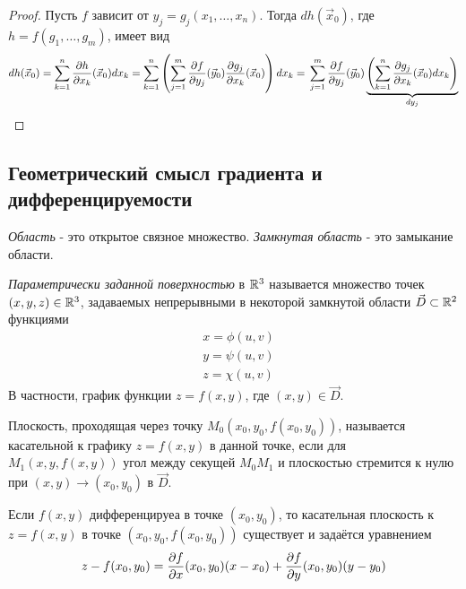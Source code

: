 \begin{proof}
	Пусть $f$ зависит от $y_j = g_j(x_1, \ldots, x_n)$. Тогда $dh(\vec{x}_0)$, где $h = f(g_1, \ldots, g_m)$, имеет вид
	\[
		dh(\vec{x}_0) = \sum\limits_{k = 1}^n \frac{\partial h}{\partial x_k} (\vec{x}_0) dx_k = \sum\limits_{k = 1}^n \left(\sum\limits_{j = 1}^m \frac{\partial f}{\partial y_j} (\vec{y}_0) \frac{\partial g_j}{\partial x_k} (\vec{x}_0)\right) dx_k =
		\\
		\sum\limits_{j = 1}^m \frac{\partial f}{\partial y_j} (\vec{y}_0) \underbrace{\left(\sum\limits_{k = 1}^n \frac{\partial g_j}{\partial x_k} (\vec{x}_0) dx_k\right)}_{dy_j}
	\]
\end{proof}

\subsection{Геометрический смысл градиента и дифференцируемости}

\begin{definition}
	\textit{Область} - это открытое связное множество. \textit{Замкнутая область} - это замыкание области.
\end{definition}

\begin{definition}
	\textit{Параметрически заданной поверхностью} в $\mathbb{R}^3$ называется множество точек $(x, y, z) \in \mathbb{R}^3$, задаваемых непрерывными в некоторой замкнутой области $\vec{D} \subset \mathbb{R}^2$ функциями
	\begin{align*}
		&{x = \phi(u, v)}
		\\
		&{y = \psi(u, v)}
		\\
		&{z = \chi(u, v)}
	\end{align*}
	В частности, график функции $z = f(x, y)$, где $(x, y) \in \vec{D}$.
\end{definition}

\begin{definition}
	Плоскость, проходящая через точку $M_0(x_0, y_0, f(x_0, y_0))$, называется касательной к графику $z = f(x, y)$ в данной точке, если для $M_1(x, y, f(x, y))$ угол между секущей $M_0 M_1$ и плоскостью стремится к нулю при $(x, y) \to (x_0, y_0)$ в $\vec{D}$.
\end{definition}


\begin{theorem}
	Если $f(x, y)$ дифференцируеа в точке $(x_0, y_0)$, то касательная плоскость к $z = f(x, y)$ в точке $(x_0, y_0, f(x_0, y_0))$ существует и задаётся уравнением
	\[
		z - f(x_0, y_0) = \frac{\partial f}{\partial x} (x_0, y_0) (x - x_0) + \frac{\partial f}{\partial y} (x_0, y_0) (y - y_0)
	\]
\end{theorem}

